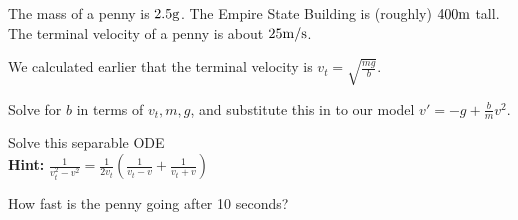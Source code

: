 \begin{applicationActivities}
\begin{observation}
The mass of a penny is \(2.5 {\rm g}\).  The Empire State Building is (roughly) \(400 {\rm m}\) tall.
\vfill
The terminal velocity of a penny is about \(25 {\rm m/s}\).
\end{observation}

\begin{activity}{20}
We calculated earlier that the terminal velocity is \(v_t = \sqrt{\frac{mg}{b}}\).  
\begin{subactivity}
Solve for \(b\) in terms of \(v_t,m,g\), and substitute this in to our model \(v'=-g+\frac{b}{m}v^2\).
\end{subactivity}
\begin{subactivity}
Solve this separable ODE \\
\textbf{Hint:} \(\frac{1}{v_t^2-v^2}=\frac{1}{2v_t}\left(\frac{1}{v_t-v}+\frac{1}{v_t+v}\right)\)
\end{subactivity}
\begin{subactivity}
How fast is the penny going after 10 seconds?
\end{subactivity}
\end{activity}



\end{applicationActivities}
